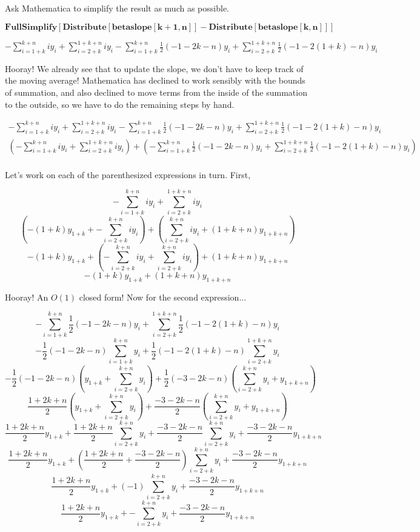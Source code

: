 \documentclass{article}
\begin{document}
Ask Mathematica to simplify the result as much as possible.

\begin{doublespace}
\noindent\(\pmb{\text{FullSimplify}[\text{Distribute}[\text{betaslope}[k+1, n]] - \text{Distribute}[\text{betaslope}[k, n]]] }\)
\end{doublespace}

\begin{doublespace}
\noindent\(-\sum _{i=1+k}^{k+n} i y_i+\sum _{i=2+k}^{1+k+n} i y_i-\sum _{i=1+k}^{k+n} \frac{1}{2} (-1-2 k-n) y_i+\sum _{i=2+k}^{1+k+n} \frac{1}{2}
(-1-2 (1+k)-n) y_i\)
\end{doublespace}


Hooray! We already see that to update the slope, we don't have to keep track of the moving average!  Mathematica has declined to work sensibly with the bounds of summation, and also declined to move terms from the inside of the summation to the outside, so we have to do the remaining steps by hand.

\begin{align*}
-\sum _{i=1+k}^{k+n} i y_i+\sum _{i=2+k}^{1+k+n} i y_i-\sum _{i=1+k}^{k+n} \frac{1}{2} (-1-2 k-n) y_i+\sum _{i=2+k}^{1+k+n} \frac{1}{2}(-1-2 (1+k)-n) y_i\\
\left(-\sum _{i=1+k}^{k+n} i y_i+\sum _{i=2+k}^{1+k+n} i y_i\right)+\left(-\sum _{i=1+k}^{k+n} \frac{1}{2} (-1-2 k-n) y_i+\sum _{i=2+k}^{1+k+n} \frac{1}{2}(-1-2 (1+k)-n) y_i\right)\\
\end{align*}

Let's work on each of the parenthesized expressions in turn. First,

\[ -\sum _{i=1+k}^{k+n} i y_i+\sum _{i=2+k}^{1+k+n} i y_i \]
\[ \left(-(1+k)y_{1+k}+-\sum _{i=2+k}^{k+n} i y_i\right)+\left(\sum _{i=2+k}^{k+n} i y_i + (1+k+n)y_{1+k+n}\right) \]
\[ -(1+k)y_{1+k}+\left(-\sum _{i=2+k}^{k+n} i y_i+\sum _{i=2+k}^{k+n} i y_i\right) + (1+k+n)y_{1+k+n} \]
\[ -(1+k)y_{1+k}+ (1+k+n)y_{1+k+n} \]

Hooray! An $O(1)$ closed form! Now for the second expression...

\[ -\sum _{i=1+k}^{k+n} \frac{1}{2} (-1-2 k-n) y_i+\sum _{i=2+k}^{1+k+n} \frac{1}{2}(-1-2 (1+k)-n) y_i \]
\[ -\frac{1}{2} (-1-2 k-n)\sum _{i=1+k}^{k+n}y_i + \frac{1}{2}(-1-2 (1+k)-n)\sum _{i=2+k}^{1+k+n}  y_i \]
\[ -\frac{1}{2} (-1-2 k-n)\left(y_{1+k} + \sum _{i=2+k}^{k+n}y_i\right) + \frac{1}{2}(-3 -2k-n)\left(\sum _{i=2+k}^{k+n}  y_i + y_{1+k+n}\right) \]
\[ \frac{1+2 k+n}{2}\left(y_{1+k} + \sum _{i=2+k}^{k+n}y_i\right) + \frac{-3 -2k-n}{2}\left(\sum _{i=2+k}^{k+n}  y_i + y_{1+k+n}\right) \]
\[ \frac{1+2 k+n}{2}y_{1+k} + \frac{1+2 k+n}{2}\sum _{i=2+k}^{k+n}y_i + \frac{-3 -2k-n}{2}\sum _{i=2+k}^{k+n}  y_i + \frac{-3 -2k-n}{2}y_{1+k+n} \]
\[ \frac{1+2 k+n}{2}y_{1+k} + \left(\frac{1+2 k+n}{2} + \frac{-3 -2k-n}{2}\right)\sum _{i=2+k}^{k+n}  y_i + \frac{-3 -2k-n}{2}y_{1+k+n} \]
\[ \frac{1+2 k+n}{2}y_{1+k} + \left(-1\right)\sum _{i=2+k}^{k+n}  y_i + \frac{-3 -2k-n}{2}y_{1+k+n} \]
\[ \frac{1+2 k+n}{2}y_{1+k} + -\sum _{i=2+k}^{k+n}  y_i + \frac{-3 -2k-n}{2}y_{1+k+n} \]
\end{document}
